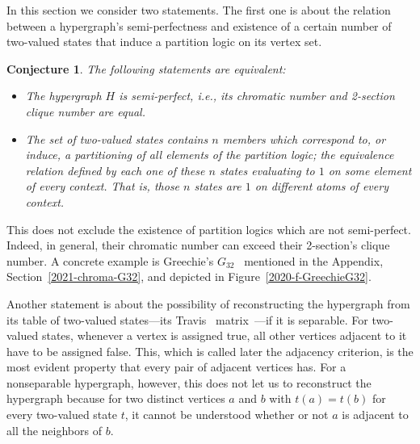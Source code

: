 \documentclass[%
12pt,
prereprint,
showpacs,
showkeys,
preprintnumbers,
amsmath,amssymb,
aps,
pra,
longbibliography,
notitlepage
]{revtex4-1}
\newtheorem{conjecture}[theorem]{{\color{THM}Conjecture}}
\theoremstyle{definition}
\begin{document}
        In this section we consider two statements. The first one is about the relation between a hypergraph's semi-perfectness and existence of a certain number of two-valued states that induce a partition logic on its vertex set.


        \begin{conjecture}\label{c1} The following statements are equivalent:

                \begin{itemize}
                        \item[(i)]
                        The hypergraph $H$ is semi-perfect, i.e., its chromatic number and 2-section clique number are equal.%
                        \item[(ii)]
                        The set of two-valued states contains $n$ members which correspond
                        to, or induce, a partitioning of all elements of the partition logic;
                        the equivalence relation defined by each one of these $n$ states evaluating to $1$ on some element of every context.
                        That is, those $n$ states are $1$ on different atoms of every context.
                \end{itemize}
        \end{conjecture}

        This does not exclude the existence of partition logics which are not semi-perfect.
        Indeed, in general, their chromatic number can exceed their 2-section's clique number.
        A concrete example is
        Greechie's $G_{32}$~\cite[Figure~6, p.~121]{greechie:71} mentioned in the Appendix, Section~\ref{2021-chroma-G32}, and depicted in
        Figure~\ref{2020-f-GreechieG32}.

        Another statement is about the possibility of reconstructing the hypergraph from its table of two-valued states---its Travis~\cite{travis-mt-62} matrix~\cite{greechie-66-PhD}---if it is separable. For two-valued states, whenever a vertex is assigned true, all other vertices adjacent to it have to be assigned false. This, which is called later the adjacency criterion, is the most evident property that every pair of adjacent vertices has. For a nonseparable hypergraph, however, this does not let us to reconstruct the hypergraph because for two distinct vertices $a$ and $b$ with $t(a)=t(b)$ for every two-valued state $t$, it cannot be understood whether or not $a$ is adjacent to all the neighbors of $b$.
\end{document}
